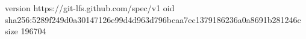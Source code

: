 version https://git-lfs.github.com/spec/v1
oid sha256:5289f249d0a30147126e99d4d963d796bcaa7ec1379186236a0a8691b281246c
size 196704
